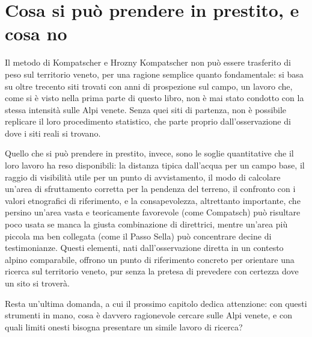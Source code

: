 \section{Cosa si può prendere in prestito, e cosa no}

Il metodo di Kompatscher e Hrozny Kompatscher non può essere trasferito di peso sul territorio veneto, per una ragione semplice quanto fondamentale: si basa su oltre trecento siti trovati con anni di prospezione sul campo, un lavoro che, come si è visto nella prima parte di questo libro, non è mai stato condotto con la stessa intensità sulle Alpi venete. Senza quei siti di partenza, non è possibile replicare il loro procedimento statistico, che parte proprio dall'osservazione di dove i siti reali si trovano.

Quello che si può prendere in prestito, invece, sono le soglie quantitative che il loro lavoro ha reso disponibili: la distanza tipica dall'acqua per un campo base, il raggio di visibilità utile per un punto di avvistamento, il modo di calcolare un'area di sfruttamento corretta per la pendenza del terreno, il confronto con i valori etnografici di riferimento, e la consapevolezza, altrettanto importante, che persino un'area vasta e teoricamente favorevole (come Compatsch) può risultare poco usata se manca la giusta combinazione di direttrici, mentre un'area più piccola ma ben collegata (come il Passo Sella) può concentrare decine di testimonianze. Questi elementi, nati dall'osservazione diretta in un contesto alpino comparabile, offrono un punto di riferimento concreto per orientare una ricerca sul territorio veneto, pur senza la pretesa di prevedere con certezza dove un sito si troverà.

Resta un'ultima domanda, a cui il prossimo capitolo dedica attenzione: con questi strumenti in mano, cosa è davvero ragionevole cercare sulle Alpi venete, e con quali limiti onesti bisogna presentare un simile lavoro di ricerca?
